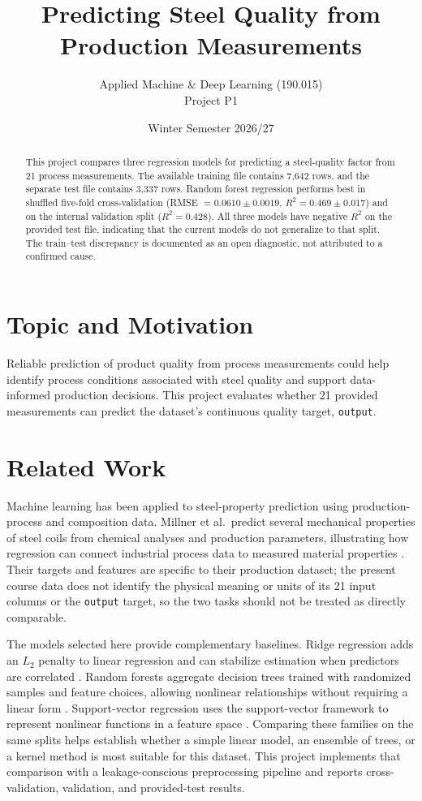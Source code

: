 \documentclass[11pt,a4paper]{article}
\title{Predicting Steel Quality from Production Measurements}
\author{Applied Machine \& Deep Learning (190.015)\\Project P1}
\date{Winter Semester 2026/27}
\begin{document}
\maketitle

\begin{abstract}
This project compares three regression models for predicting a steel-quality
factor from 21 process measurements. The available training file contains
7,642 rows, and the separate test file contains 3,337 rows. Random forest
regression performs best in shuffled five-fold cross-validation
(RMSE $=0.0610\pm0.0019$, $R^2=0.469\pm0.017$) and on the internal
validation split ($R^2=0.428$). All three models have negative $R^2$ on the
provided test file, indicating that the current models do not generalize to
that split. The train--test discrepancy is documented as an open diagnostic,
not attributed to a confirmed cause.
\end{abstract}

\section{Topic and Motivation}
Reliable prediction of product quality from process measurements could help
identify process conditions associated with steel quality and support
data-informed production decisions. This project evaluates whether 21
provided measurements can predict the dataset's continuous quality target,
\texttt{output}.

\section{Related Work}
Machine learning has been applied to steel-property prediction using
production-process and composition data. Millner et al.\ predict several
mechanical properties of steel coils from chemical analyses and production
parameters, illustrating how regression can connect industrial process data
to measured material properties \cite{millner2023}. Their targets and
features are specific to their production dataset; the present course data
does not identify the physical meaning or units of its 21 input columns or
the \texttt{output} target, so the two tasks should not be treated as directly
comparable.

The models selected here provide complementary baselines. Ridge regression
adds an $L_2$ penalty to linear regression and can stabilize estimation when
predictors are correlated \cite{hoerl1970}. Random forests aggregate
decision trees trained with randomized samples and feature choices, allowing
nonlinear relationships without requiring a linear form \cite{breiman2001}.
Support-vector regression uses the support-vector framework to represent
nonlinear functions in a feature space \cite{cortes1995}. Comparing these
families on the same splits helps establish whether a simple linear model,
an ensemble of trees, or a kernel method is most suitable for this dataset.
This project implements that comparison with a leakage-conscious
preprocessing pipeline and reports cross-validation, validation, and
provided-test results.
\end{document}
